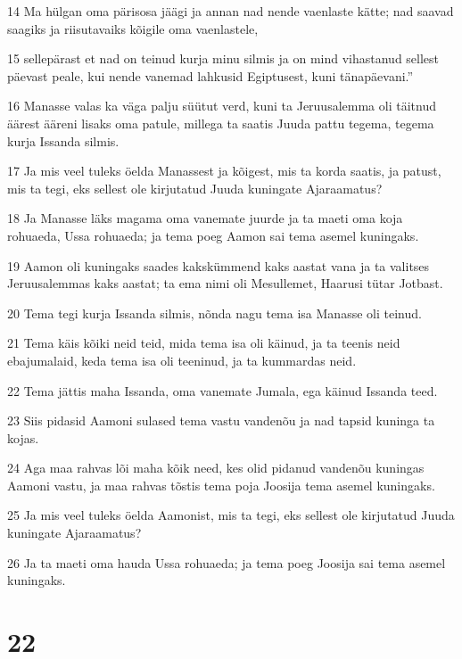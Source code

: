 \par 14 Ma hülgan oma pärisosa jäägi ja annan nad nende vaenlaste kätte; nad saavad saagiks ja riisutavaiks kõigile oma vaenlastele,
\par 15 sellepärast et nad on teinud kurja minu silmis ja on mind vihastanud sellest päevast peale, kui nende vanemad lahkusid Egiptusest, kuni tänapäevani.”
\par 16 Manasse valas ka väga palju süütut verd, kuni ta Jeruusalemma oli täitnud äärest ääreni lisaks oma patule, millega ta saatis Juuda pattu tegema, tegema kurja Issanda silmis.
\par 17 Ja mis veel tuleks öelda Manassest ja kõigest, mis ta korda saatis, ja patust, mis ta tegi, eks sellest ole kirjutatud Juuda kuningate Ajaraamatus?
\par 18 Ja Manasse läks magama oma vanemate juurde ja ta maeti oma koja rohuaeda, Ussa rohuaeda; ja tema poeg Aamon sai tema asemel kuningaks.
\par 19 Aamon oli kuningaks saades kakskümmend kaks aastat vana ja ta valitses Jeruusalemmas kaks aastat; ta ema nimi oli Mesullemet, Haarusi tütar Jotbast.
\par 20 Tema tegi kurja Issanda silmis, nõnda nagu tema isa Manasse oli teinud.
\par 21 Tema käis kõiki neid teid, mida tema isa oli käinud, ja ta teenis neid ebajumalaid, keda tema isa oli teeninud, ja ta kummardas neid.
\par 22 Tema jättis maha Issanda, oma vanemate Jumala, ega käinud Issanda teed.
\par 23 Siis pidasid Aamoni sulased tema vastu vandenõu ja nad tapsid kuninga ta kojas.
\par 24 Aga maa rahvas lõi maha kõik need, kes olid pidanud vandenõu kuningas Aamoni vastu, ja maa rahvas tõstis tema poja Joosija tema asemel kuningaks.
\par 25 Ja mis veel tuleks öelda Aamonist, mis ta tegi, eks sellest ole kirjutatud Juuda kuningate Ajaraamatus?
\par 26 Ja ta maeti oma hauda Ussa rohuaeda; ja tema poeg Joosija sai tema asemel kuningaks.

\chapter{22}

